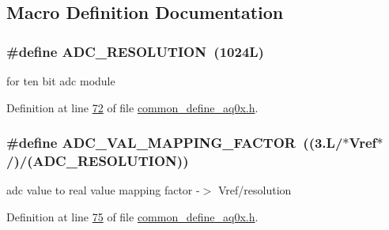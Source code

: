 \subsection{Macro Definition Documentation}
\hypertarget{a00031_a00978ca9e8220475258dcbbbb7d29129}{
\subsubsection[{A\+D\+C\+\_\+\+R\+E\+S\+O\+L\+U\+T\+I\+O\+N}]{\setlength{\rightskip}{0pt plus 5cm}\#define A\+D\+C\+\_\+\+R\+E\+S\+O\+L\+U\+T\+I\+O\+N~(1024\+L)}}\label{a00031_a00978ca9e8220475258dcbbbb7d29129}


for ten bit adc module 



Definition at line \hyperlink{a00031_source_l00072}{72} of file \hyperlink{a00031_source}{common\+\_\+define\+\_\+aq0x.\+h}.

\hypertarget{a00031_ada92d3eeeec0cbeee41e76a52d145792}{
\subsubsection[{A\+D\+C\+\_\+\+V\+A\+L\+\_\+\+M\+A\+P\+P\+I\+N\+G\+\_\+\+F\+A\+C\+T\+O\+R}]{\setlength{\rightskip}{0pt plus 5cm}\#define A\+D\+C\+\_\+\+V\+A\+L\+\_\+\+M\+A\+P\+P\+I\+N\+G\+\_\+\+F\+A\+C\+T\+O\+R~((3.\+L/$\ast$\+Vref$\ast$/)/(\+A\+D\+C\+\_\+\+R\+E\+S\+O\+L\+U\+T\+I\+O\+N))}}\label{a00031_ada92d3eeeec0cbeee41e76a52d145792}


adc value to real value mapping factor -\/$>$ Vref/resolution 



Definition at line \hyperlink{a00031_source_l00075}{75} of file \hyperlink{a00031_source}{common\+\_\+define\+\_\+aq0x.\+h}.



